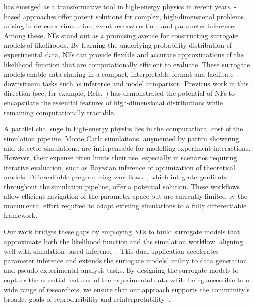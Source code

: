 \documentclass[aps,nofootinbib,superscriptaddress,reprint,preprintnumbers]{revtex4-1}
\begin{document}
\ML has emerged as a transformative tool in high-energy physics in recent years. \ML-based approaches offer potent solutions for complex, high-dimensional problems arising in detector simulation, event reconstruction, and parameter inference. Among these, \acp{NF} stand out as a promising avenue for constructing surrogate models of likelihoods. By learning the underlying probability distribution of experimental data, \acp{NF} can provide flexible and accurate approximations of the likelihood function that are computationally efficient to evaluate. These surrogate models enable data sharing in a compact, interpretable format and facilitate downstream tasks such as inference and model comparison. Previous work in this direction (see, for example, Refs.~\cite{Coccaro:2019lgs, Reyes-Gonzalez:2023oei, Beck:2023xou}) has demonstrated the potential of \acp{NF} to encapsulate the essential features of high-dimensional distributions while remaining computationally tractable.

A parallel challenge in high-energy physics lies in the computational cost of the simulation pipeline. Monte Carlo simulations, augmented by parton showering and detector simulations, are indispensable for modelling experiment interactions. However, their expense often limits their use, especially in scenarios requiring iterative evaluation, such as Bayesian inference or optimization of theoretical models. Differentiable programming workflows~\cite{Heinrich:2022qlq,Smith:2023ssh,Adelmann:2022ozp,Heimel:2022wyj,Kagan:2023gxz,Kofler:2024efb,Vigl:2024lat,Kagan:2023gxz,Heimel:2023ngj,Heimel:2024wph}, which integrate gradients throughout the simulation pipeline, offer a potential solution. These workflows allow efficient navigation of the parameter space but are currently limited by the monumental effort required to adapt existing simulations to a fully differentiable framework.

Our work bridges these gaps by employing \acp{NF} to build surrogate models that approximate both the likelihood function and the simulation workflow, aligning well with simulation-based inference~\cite{Cranmer:2019eaq, Brehmer:2019xox, Brehmer:2018eca, Brehmer:2018kdj, Mastandrea:2024irf, Dax:2023ozk}. This dual application accelerates parameter inference and extends the surrogate models' utility to data generation and pseudo-experimental analysis tasks. By designing the surrogate models to capture the essential features of the experimental data while being accessible to a wide range of researchers, we ensure that our approach supports the community’s broader goals of reproducibility and reinterpretability~\cite{Araz:2023mda}.
\end{document}
